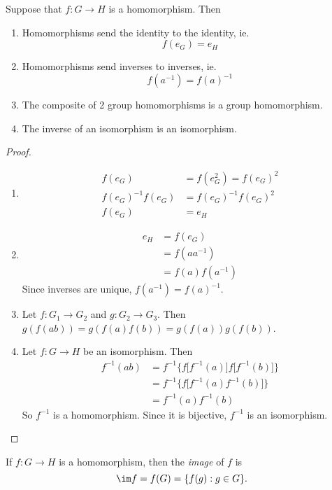 \documentclass[a4paper]{article}
\begin{document}
\begin{prop}
  Suppose that $f: G\rightarrow H$ is a homomorphism. Then
  \begin{enumerate}
    \item Homomorphisms send the identity to the identity, ie.
      \[
        f(e_G) = e_H
      \]
    \item Homomorphisms send inverses to inverses, ie.
      \[
        f(a^{-1}) = f(a)^{-1}
      \]
    \item The composite of 2 group homomorphisms is a group homomorphism.
    \item The inverse of an isomorphism is an isomorphism.
  \end{enumerate}
\end{prop}
\begin{proof}\leavevmode
  \begin{enumerate}
    \item \begin{align*}
        f(e_G) &= f(e_G^2) = f(e_G)^2\\
        f(e_G)^{-1}f(e_G) &= f(e_G)^{-1}f(e_G)^2\\
        f(e_G) &= e_H
      \end{align*}
    \item \begin{align*}
        e_H &= f(e_G)\\
        &= f(aa^{-1})\\
        &= f(a)f(a^{-1})
      \end{align*}
      Since inverses are unique, $f(a^{-1}) = f(a)^{-1}$.
    \item Let $f:G_1 \rightarrow G_2$ and $g:G_2 \rightarrow G_3$. Then $g(f(ab)) = g(f(a)f(b)) = g(f(a))g(f(b))$.
    \item Let $f:G \rightarrow H$ be an isomorphism. Then
      \begin{align*}
        f^{-1}(ab) &= f^{-1}\Big\{f\big[f^{-1}(a)\big]f\big[f^{-1}(b)\big]\Big\}\\
        &= f^{-1}\Big\{f\big[f^{-1}(a)f^{-1}(b)\big]\Big\}\\
        &= f^{-1}(a)f^{-1}(b)
      \end{align*}
      So $f^{-1}$ is a homomorphism. Since it is bijective, $f^{-1}$ is an isomorphism.
  \end{enumerate}
\end{proof}

\begin{defi}
  If $f:G\rightarrow H$ is a homomorphism, then the \emph{image} of $f$ is
  \[
    \im f = f(G) = \{f(g):g\in G\}.
  \]
\end{defi}
\end{document}
